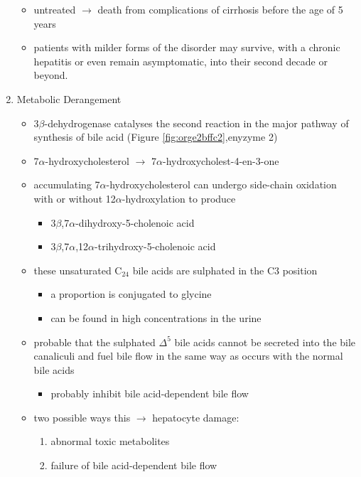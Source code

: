 \documentclass{scrartcl}
\begin{document}
\begin{enumerate}
\begin{itemize}
\item untreated \(\to\) death from complications of cirrhosis before the age
of 5 years
\item patients with milder forms of the disorder may survive, with a
chronic hepatitis or even remain asymptomatic, into their second
decade or beyond.
\end{itemize}
\item Metabolic Derangement
\label{sec:org4436f3a}
\begin{itemize}
\item 3\(\beta\)-dehydrogenase catalyses the second reaction in the major
pathway of synthesis of bile acid (Figure \ref{fig:orge2bffc2},enyzyme 2)
\item 7\(\alpha\)-hydroxycholesterol \(\to\) 7\(\alpha\)-hydroxycholest-4-en-3-one
\item accumulating 7\(\alpha\)-hydroxycholesterol can undergo side-chain
oxidation with or without 12\(\alpha\)-hydroxylation to produce
\begin{itemize}
\item 3\(\beta\),7\(\alpha\)-dihydroxy-5-cholenoic acid
\item 3\(\beta\),7\(\alpha\),12\(\alpha\)-trihydroxy-5-cholenoic acid
\end{itemize}
\item these unsaturated C\(_{\text{24}}\) bile acids are sulphated in the C3 position
\begin{itemize}
\item a proportion is conjugated to glycine
\item can be found in high concentrations in the urine
\end{itemize}
\item probable that the sulphated \(\Delta^{\text{5}}\) bile acids cannot be secreted
into the bile canaliculi and fuel bile flow in the same way as
occurs with the normal bile acids
\begin{itemize}
\item probably inhibit bile acid-dependent bile flow
\end{itemize}
\item two possible ways this \(\to\) hepatocyte damage:
\begin{enumerate}
\item abnormal toxic metabolites
\item failure of bile acid-dependent bile flow
\end{enumerate}
\end{itemize}


\end{enumerate}
\end{document}
